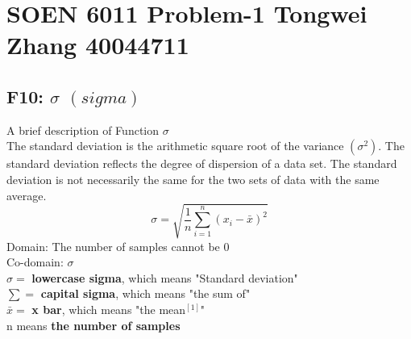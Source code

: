 \documentclass[12pt]{report}
\begin{document}
\section*{SOEN 6011 Problem-1 Tongwei Zhang  40044711}
\vspace{-0.4cm}
\subsection*{F10: $\sigma$  $(sigma)$}
\vspace{-0.3cm}
A brief description of Function $\sigma$ \\
The standard deviation is the arithmetic square root of the variance $(\sigma^2)$. The standard deviation reflects the degree of dispersion of a data set. The standard deviation is not necessarily the same for the two sets of data with the same average.
   $$\sigma=\sqrt{\frac{1}{n}{\sum_{i=1}^n(x_i-\bar{x})^2}}$$
Domain: The number of samples cannot be 0\\
Co-domain: $\sigma$ \\
$\sigma =$ \textbf{lowercase sigma}, which means "Standard deviation"\\
$\sum =$ \textbf{capital sigma}, which means "the sum of"\\
$\bar{x} =$ \textbf{x bar}, which means "the mean$^{[1]}$"\\
n means \textbf{the number of samples}\\
\vspace{-0.4cm}
\begin{center}
\end{center}
\end{document}
